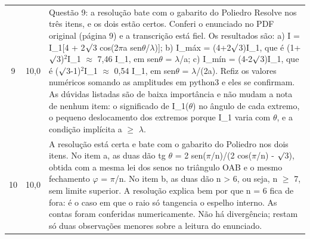 \documentclass{article}%
\begin{document}
\begin{longtable}{@{}c c p{}@{}}
9 & 10,0 & Questão 9: a resolução bate com o gabarito do Poliedro Resolve nos três itens, e os dois estão certos. Conferi o enunciado no PDF original (página 9) e a transcrição está fiel. Os resultados são:\newline%
a) I = I\_1{[}4 + 2$\surd$3 cos(2$\pi$a sen$\theta$/$\lambda$){]};\newline%
b) I\_máx = (4+2$\surd$3)I\_1, que é (1+$\surd$3)$^2$I\_1 $\approx$ 7,46 I\_1, em sen$\theta$ = $\lambda$/a;\newline%
c) I\_mín = (4-2$\surd$3)I\_1, que é ($\surd$3-1)$^2$I\_1 $\approx$ 0,54 I\_1, em sen$\theta$ = $\lambda$/(2a).\newline%
Refiz os valores numéricos somando as amplitudes em python3 e eles se confirmam. As dúvidas listadas são de baixa importância e não mudam a nota de nenhum item: o significado de I\_1($\theta$) no ângulo de cada extremo, o pequeno deslocamento dos extremos porque I\_1 varia com $\theta$, e a condição implícita a $\geq$ $\lambda$. \\
10 & 10,0 & A resolução está certa e bate com o gabarito do Poliedro nos dois itens. No item a, as duas dão tg $\theta$ = 2 sen($\pi$/n)/(2 cos($\pi$/n) - $\surd$3), obtida com a mesma lei dos senos no triângulo OAB e o mesmo fechamento $\varphi$ = $\pi$/n. No item b, as duas dão n > 6, ou seja, n $\geq$ 7, sem limite superior. A resolução explica bem por que n = 6 fica de fora: é o caso em que o raio só tangencia o espelho interno. As contas foram conferidas numericamente. Não há divergência; restam só duas observações menores sobre a leitura do enunciado. \\
\bottomrule\end{longtable}%
\end{document}

